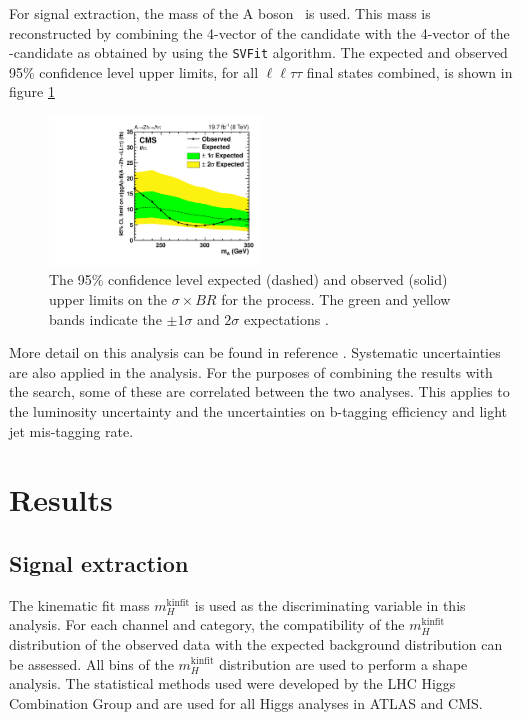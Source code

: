For signal extraction, the mass of the A boson \mA~is used. This mass is reconstructed by combining the
4-vector of the \PZ candidate with the 4-vector of the \Ph -candidate as obtained by using the 
\texttt{SVFit} algorithm. The expected and observed 95\% confidence level upper limits, for
all $\ell\ell\tau\tau$ final states combined, is shown in figure \ref{fig:AZhUpperLimits}

\begin{figure}[h!]
\begin{center}
\includegraphics[width=0.5\textwidth]{Hhh/Plots/CMS-HIG-14-034_Figure_010-a.pdf}
\caption{The 95\% confidence level expected (dashed) and observed (solid)
upper limits on the $\sigma \times BR$ for the \AtoZhtolltautau process.
The green and yellow bands indicate the $\pm 1 \sigma $ and $2\sigma$
expectations \cite{CMS-HIG-14-034}.}
\label{fig:AZhUpperLimits}
\end{center}
\end{figure}

More detail on this analysis can be found in reference \cite{CMS-HIG-14-034}.
Systematic uncertainties are also applied in the \AtoZhtolltautau analysis. 
For the purposes of combining the results with the \Htohhtobbtautau search,
some of these are correlated between the two analyses.
This applies to the
luminosity uncertainty and the uncertainties on b-tagging efficiency
and light jet mis-tagging rate.

\section{Results}
\label{sec:hhh_results}
\subsection{Signal extraction}
\label{sec:hhh_results_extraction}
The kinematic fit mass $m_{H}^{\text{kinfit}}$ is used as the discriminating variable in this analysis.
For each channel and category, the compatibility of the $m_{H}^{\text{kinfit}}$ distribution
of the observed data with the expected background distribution can be assessed. All bins
of the $m_{H}^{\text{kinfit}}$ distribution are used to perform a shape analysis. The 
statistical methods used were developed by the LHC Higgs Combination Group \cite{LHCHComb2011} 
and are used for all Higgs analyses in ATLAS and CMS. 

